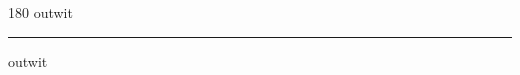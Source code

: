 
\begin{frame}
\begin{center}
\begin{turn}{180}
{\fontsize{2.5cm}{1em}\selectfont outwit}
\end{turn}
\vspace{1em}\par  
\hrule
\vspace{1em}\par  
{\fontsize{2.5cm}{1em}\selectfont outwit}
\end{center}
\end{frame}
